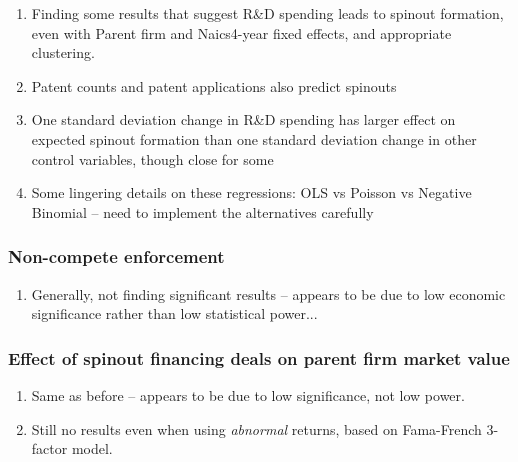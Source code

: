 \documentclass[12pt,english]{article}
\theoremstyle{remark}
\begin{document}
\begin{enumerate}
	\item Finding some results that suggest R\&D spending leads to spinout formation, even with Parent firm and Naics4-year fixed effects, and appropriate clustering. 
	\item Patent counts and patent applications also predict spinouts
	\item One standard deviation change in R\&D spending has larger effect on expected spinout formation than one standard deviation change in other control variables, though close for some
	\item Some lingering details on these regressions: OLS vs Poisson vs Negative Binomial -- need to implement the alternatives carefully
\end{enumerate}

\subsubsection{Non-compete enforcement}

\begin{enumerate}
	\item Generally, not finding significant results -- appears to be due to low economic significance rather than low statistical power...
\end{enumerate}

\subsubsection{Effect of spinout financing deals on parent firm market value}

\begin{enumerate}
	\item Same as before -- appears to be due to low significance, not low power.
	\item Still no results even when using \textit{abnormal} returns, based on Fama-French 3-factor model.
\end{enumerate}
\end{document}
